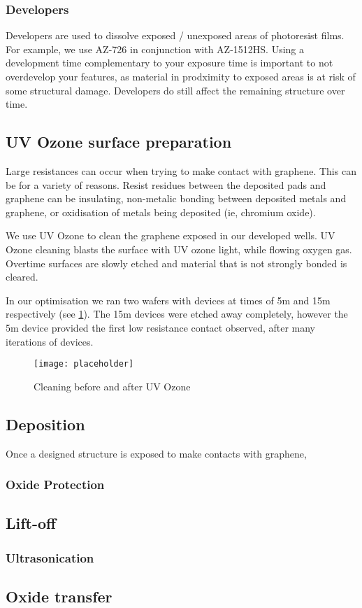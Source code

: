 \documentclass[../../Matt_Gebert_Honours_Thesis.tex]{subfiles}
\begin{document}
	\subsubsection{Developers}\label{sec:developer}
	Developers are used to dissolve exposed / unexposed areas of photoresist films. For example, we use AZ-726 in conjunction with AZ-1512HS. Using a development time complementary to your exposure time is important to not overdevelop your features, as material in prodximity to exposed areas is at risk of some structural damage. Developers do still affect the remaining structure over time.
	
	\subsection{UV Ozone surface preparation}\label{sec:uv_ozone}
	Large resistances can occur when trying to make contact with graphene. This can be for a variety of reasons. Resist residues between the deposited pads and graphene can be insulating, non-metalic bonding between deposited metals and graphene, or oxidisation of metals being deposited (ie, chromium oxide).
	
	We use UV Ozone to clean the graphene exposed in our developed wells. UV Ozone cleaning blasts the surface with UV ozone light, while flowing oxygen gas. Overtime surfaces are slowly etched and material that is not strongly bonded is cleared. 
	
	In our optimisation we ran two wafers with devices at times of 5m and 15m respectively (see \cref{fig:UV_ozone}). The 15m devices were etched away completely, however the 5m device provided the first low resistance contact observed, after many iterations of devices.
	
	\begin{figure}[H]
		\centering
		\texttt{[image: placeholder]}
		\caption{Cleaning before and after UV Ozone}\label{fig:UV_ozone}
	\end{figure}
	
	\subsection{Deposition}\label{sec:deposition}
	Once a designed structure is exposed to make contacts with graphene, 
	
	\subsubsection{Oxide Protection}\label{sec:deposition_oxide_protection}
	
	\subsection{Lift-off}\label{}
	\subsubsection{Ultrasonication}
	
	\subsection{Oxide transfer}
	
\end{document}
